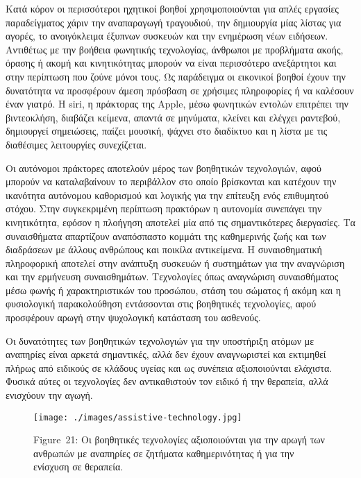 \documentclass[
]{article}
\begin{document}
Κατά κόρον οι περισσότεροι ηχητικοί βοηθοί χρησιμοποιούνται για απλές
εργασίες παραδείγματος χάριν την αναπαραγωγή τραγουδιού, την δημιουργία
μίας λίστας για αγορές, το ανοιγόκλειμα έξυπνων συσκευών και την
ενημέρωση νέων ειδήσεων. Αντιθέτως με την βοήθεια φωνητικής τεχνολογίας,
άνθρωποι με προβλήματα ακοής, όρασης ή ακομή και κινητικότητας μπορούν
να είναι περισσότερο ανεξάρτητοι και στην περίπτωση που ζούνε μόνοι
τους. Ως παράδειγμα οι εικονικοί βοηθοί έχουν την δυνατότητα να
προσφέρουν άμεση πρόσβαση σε χρήσιμες πληροφορίες ή να καλέσουν έναν
γιατρό. Η siri, η πράκτορας της Apple, μέσω φωνητικών εντολών επιτρέπει
την βιντεοκλήση, διαβάζει κείμενα, απαντά σε μηνύματα, κλείνει και
ελέγχει ραντεβού, δημιουργεί σημειώσεις, παίζει μουσική, ψάχνει στο
διαδίκτυο και η λίστα με τις διαθέσιμες λειτουργίες συνεχίζεται.

Οι αυτόνομοι πράκτορες αποτελούν μέρος των βοηθητικών τεχνολογιών, αφού
μπορούν να καταλαβαίνουν το περιβάλλον στο οποίο βρίσκονται και κατέχουν
την ικανότητα αυτόνομου καθορισμού και λογικής για την επίτευξη ενός
επιθυμητού στόχου. Στην συγκεκριμένη περίπτωση πρακτόρων η αυτονομία
συνεπάγει την κινητικότητα, εφόσον η πλοήγηση αποτελεί μία από τις
σημαντικότερες διεργασίες. Τα συναισθήματα απαρτίζουν αναπόσπαστο
κομμάτι της καθημερινής ζωής και των διαδράσεων με άλλους ανθρώπους και
ποικίλα αντικείμενα. Η συναισθηματική πληροφορική αποτελεί στην ανάπτυξη
συσκευών ή συστημάτων για την αναγνώριση και την ερμήνευση
συναισθημάτων. Τεχνολογίες όπως αναγνώριση συναισθήματος μέσω φωνής ή
χαρακτηριστικών του προσώπου, στάση του σώματος ή ακόμη και η
φυσιολογική παρακολούθηση εντάσσονται στις βοηθητικές τεχνολογίες, αφού
προσφέρουν αρωγή στην ψυχολογική κατάσταση του ασθενούς.

Οι δυνατότητες των βοηθητικών τεχνολογιών για την υποστήριξη ατόμων με
αναπηρίες είναι αρκετά σημαντικές, αλλά δεν έχουν αναγνωριστεί και
εκτιμηθεί πλήρως από ειδικούς σε κλάδους υγείας και ως συνέπεια
αξιοποιούνται ελάχιστα. Φυσικά αύτες οι τεχνολογίες δεν αντικαθιστούν
τον ειδικό ή την θεραπεία, αλλά ενισχύουν την αγωγή.

\leavevmode{}%
\begin{figure}
\hypertarget{fig:agent-in-cs}{%
\centering
\texttt{[image: ./images/assistive-technology.jpg]}
\caption{Figure~21: Οι βοηθητικές τεχνολογίες αξιοποιούνται για την
αρωγή των ανθρωπών με αναπηρίες σε ζητήματα καθημερινότητας ή για την
ενίσχυση σε θεραπεία.}\label{fig:agent-in-cs}
}
\end{figure}
\end{document}
